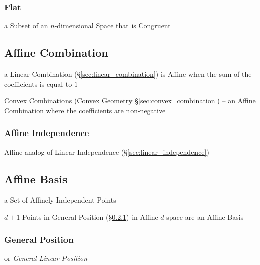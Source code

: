\subsubsection{Flat}\label{sec:flat}

a Subset of an $n$-dimensional Space that is Congruent



\subsection{Affine Combination}\label{sec:affine_combination}

a Linear Combination (\S\ref{sec:linear_combination}) is Affine when the sum of
the coefficients is equal to $1$

\fist Convex Combinations (Convex Geometry \S\ref{sec:convex_combination}) -- an
Affine Combination where the coefficients are non-negative



\subsubsection{Affine Independence}\label{sec:affine_independence}

Affine analog of Linear Independence (\S\ref{sec:linear_independence})



\subsection{Affine Basis}\label{sec:affine_basis}

a Set of Affinely Independent Points

$d+1$ Points in General Position (\S\ref{sec:general_position}) in Affine
$d$-space are an Affine Basis



\subsubsection{General Position}\label{sec:general_position}

or \emph{General Linear Position}

